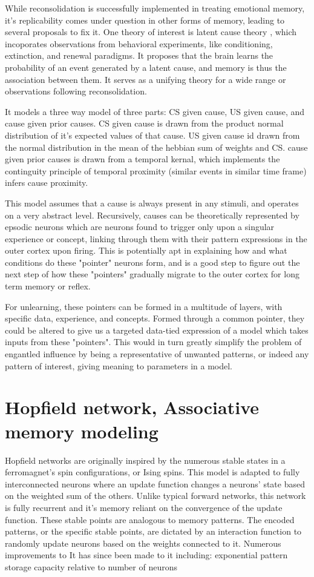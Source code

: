 \documentclass{surreydissertation}
\begin{document}
While reconsolidation is successfully implemented in treating emotional memory, it's replicability comes under question in other forms of memory, leading to several proposals to fix it. One theory of interest is latent cause theory \cite{gershman2017computational}, which incoporates observations from behavioral experiments, like conditioning, extinction, and renewal paradigms. It proposes that the brain learns the probability of an event generated by a latent cause, and memory is thus the association between them. It serves as a unifying theory for a wide range or observations following reconsolidation.

It models a three way model of three parts: CS given cause, US given cause, and cause given prior causes.
CS given cause is drawn from the product normal distribution of it's expected values of that cause.
US given cause id drawn from the normal distribution in the mean of the hebbian sum of weights and CS.
cause given prior causes is drawn from a temporal kernal, which implements the continguity principle of temporal proximity (similar events in similar time frame) infers cause proximity.

This model assumes that a cause is always present in any stimuli, and operates on a very abstract level. Recursively, causes can be theoretically represented by epsodic neurons which are neurons found to trigger only upon a singular experience or concept, linking through them with their pattern expressions in the outer cortex upon firing. This is potentially apt in explaining how and what conditions do these "pointer" neurons form, and is a good step to figure out the next step of how these "pointers" gradually migrate to the outer cortex for long term memory or reflex.

For unlearning, these pointers can be formed in a multitude of layers, with specific data, experience, and concepts. Formed through a common pointer, they could be altered to give us a targeted data-tied expression of a model which takes inputs from these "pointers". This would in turn greatly simplify the problem of engantled influence by being a representative of unwanted patterns, or indeed any pattern of interest, giving meaning to parameters in a model.

\section{Hopfield network, Associative memory modeling}
Hopfield networks are originally inspired by the numerous stable states in a ferromagnet's spin configurations, or Ising spins. This model is adapted to fully interconnected neurons where an update function changes a neurons' state based on the weighted sum of the others. Unlike typical forward networks, this network is fully recurrent and it's memory reliant on the convergence of the update function. These stable points are analogous to memory patterns. The encoded patterns, or the specific stable points, are dictated by an interaction function to randomly update neurons based on the weights connected to it. Numerous improvements to It has since been made to it including:
exponential pattern storage capacity relative to number of neurons
\end{document}
